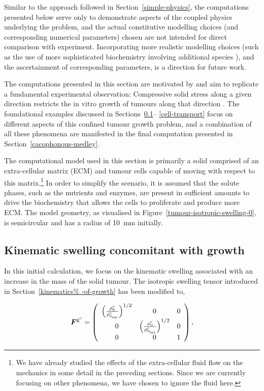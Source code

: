 Similar to the approach followed in Section~\ref{simple-physics}, the
computations presented below serve only to demonstrate aspects of the
coupled physics underlying the problem, and the actual constitutive
modelling choices (and corresponding numerical parameters) chosen are
not intended for direct comparison with experiment. Incorporating more
realistic modelling choices (such as the use of more sophisticated
biochemistry involving additional species \citep{tjacks2000}), and the
ascertainment of corresponding parameters, is a direction for future
work.

The computations presented in this section are motivated by and aim to
replicate a fundamental experimental observation: Compressive solid
stress along a given direction restricts the in vitro growth of
tumours along that direction \citep{jain1997}. The foundational
examples discussed in Sections~\ref{tumour-isotropic-swelling}--%
\ref{cell-transport} focus on different aspects of this confined
tumour growth problem, and a combination of all these phenomena are
manifested in the final computation presented in
Section~\ref{cacophonous-medley}.

The computational model used in this section is primarily a solid
comprised of an extra-cellular matrix (ECM) and tumour cells capable
of moving with respect to this matrix.\footnote{We have already
  studied the effects of the extra-cellular fluid flow on the
  mechanics in some detail in the preceding sections. Since we are
  currently focusing on other phenomena, we have chosen to ignore the
  fluid here.} In order to simplify the scenario, it is assumed that
the solute phases, such as the nutrients and enzymes, are present in
sufficient amounts to drive the biochemistry that allows the cells to
proliferate and produce more ECM. The model geometry, as visualised in
Figure~\ref{tumour-isotropic-swelling-0}, is semicircular and has a
radius of 10~mm initially.

\subsection{Kinematic swelling concomitant with growth}
\label{tumour-isotropic-swelling}

In this initial calculation, we focus on the kinematic swelling
associated with an increase in the mass of the solid tumour. The
isotropic swelling tensor introduced in Section~\ref{kinematics%
  -of-growth} has been modified to,

\begin{equation}
\mbox{\boldmath$ F$}^{\mathrm{g}^{\mathrm{c}}} = \left(
\begin{array}{ccc}
\left(\frac{\rho_0^{\mathrm{c}}}
     {\rho_{0_{\mathrm{ini}}}^{\mathrm{c}}}\right)^{1/2} & 0 & 0 \\ 0
     & \left(\frac{\rho_0^{\mathrm{c}}}
     {\rho_{0_{\mathrm{ini}}}^{\mathrm{c}}}\right)^{1/2} & 0 \\ 0 & 0
     & 1 \end{array} \right),
\label{2d-isotropic}
\end{equation}

